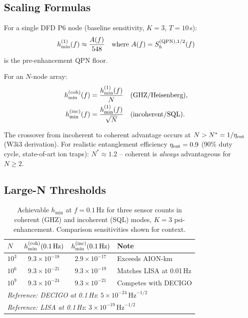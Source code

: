 \documentclass[11pt]{article}
\theoremstyle{definition}
\theoremstyle{remark}
\newcommand{\sqrtHz}{\,\mathrm{Hz}^{-1/2}}
\newcommand{\ee}[1]{\times10^{#1}}
\begin{document}
\subsection{Scaling Formulas}

For a single DFD P6 node (baseline sensitivity, $K=3$, $T=10$\,s):
\begin{equation}
h_{\min}^{(1)}(f) \approx \frac{A(f)}{548}
\quad \text{where } A(f) = S_h^{(\rm QPN),1/2}(f)
\end{equation}
is the pre-enhancement QPN floor.

For an $N$-node array:
\begin{align}
h_{\min}^{(\rm coh)}(f) &= \frac{h_{\min}^{(1)}(f)}{N}
\quad \text{(GHZ/Heisenberg)}, \label{eq:scaling-coh} \\
h_{\min}^{(\rm inc)}(f) &= \frac{h_{\min}^{(1)}(f)}{\sqrt{N}}
\quad \text{(incoherent/SQL)}. \label{eq:scaling-inc}
\end{align}

The crossover from incoherent to coherent advantage occurs at $N > N^* = 1/\eta_{\rm ent}$
(W3i3 derivation).  For realistic entanglement efficiency $\eta_{\rm ent} = 0.9$
(90\% duty cycle, state-of-art ion traps): $N^* \approx 1.2$ -- coherent is
\emph{always} advantageous for $N \geq 2$.

\subsection{Large-N Thresholds}

\begin{table}[h]
\centering
\caption{Achievable $h_{\min}$ at $f=0.1$\,Hz for three sensor counts
in coherent (GHZ) and incoherent (SQL) modes, $K=3$ psi-enhancement.
Comparison sensitivities shown for context.}
\label{tab:N-scaling}
\begin{tabular}{@{}lccl@{}}
\toprule
$N$ & $h_{\min}^{(\rm coh)}(0.1\,\rm Hz)$ & $h_{\min}^{(\rm inc)}(0.1\,\rm Hz)$ & Note \\
\midrule
$10^3$     & $9.3\ee{-18}$ & $2.9\ee{-17}$ & Exceeds AION-km \\
$10^6$     & $9.3\ee{-21}$ & $9.3\ee{-19}$ & Matches LISA at 0.01\,Hz \\
$10^9$     & $9.3\ee{-24}$ & $9.3\ee{-21}$ & Competes with DECIGO \\
\midrule
\multicolumn{4}{l}{\textit{Reference: DECIGO at 0.1\,Hz}: $5\ee{-24}\sqrtHz$} \\
\multicolumn{4}{l}{\textit{Reference: LISA at 0.1\,Hz}: $3\ee{-19}\sqrtHz$} \\
\bottomrule
\end{tabular}
\end{table}
\end{document}
